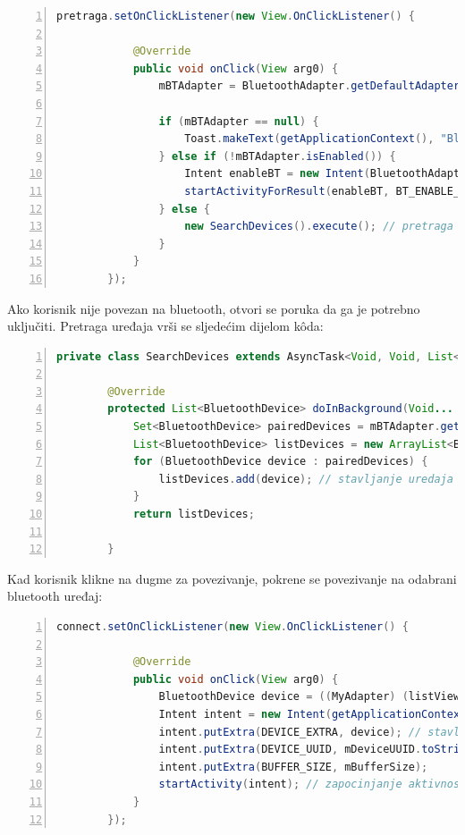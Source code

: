 \begin{lstlisting}[frame=single,language=Java,numbers=left, numberstyle=\tiny, xleftmargin=0.05\textwidth, xrightmargin=0.05\textwidth, basicstyle=\ttfamily\footnotesize]
pretraga.setOnClickListener(new View.OnClickListener() {

            @Override
            public void onClick(View arg0) {
                mBTAdapter = BluetoothAdapter.getDefaultAdapter(); // povezivanje na bluetooth adapter

                if (mBTAdapter == null) {
                    Toast.makeText(getApplicationContext(), "Bluetooth uredajii nisu pronadeni", Toast.LENGTH_SHORT).show(); // poruka ako nije pronaden ni jedan uredaj
                } else if (!mBTAdapter.isEnabled()) {
                    Intent enableBT = new Intent(BluetoothAdapter.ACTION_REQUEST_ENABLE);
                    startActivityForResult(enableBT, BT_ENABLE_REQUEST);
                } else {
                    new SearchDevices().execute(); // pretraga uredeja
                }
            }
        });
        \end{lstlisting}
 Ako korisnik nije povezan na bluetooth, otvori se poruka da ga je potrebno uključiti. Pretraga uređaja vrši se sljedećim dijelom kôda:
        \begin{lstlisting}[frame=single,language=Java,numbers=left, numberstyle=\tiny, xleftmargin=0.05\textwidth, xrightmargin=0.05\textwidth, basicstyle=\ttfamily\footnotesize]
   private class SearchDevices extends AsyncTask<Void, Void, List<BluetoothDevice>> {

        @Override
        protected List<BluetoothDevice> doInBackground(Void... params) {
            Set<BluetoothDevice> pairedDevices = mBTAdapter.getBondedDevices();
            List<BluetoothDevice> listDevices = new ArrayList<BluetoothDevice>(); // kreiranje liste
            for (BluetoothDevice device : pairedDevices) {
                listDevices.add(device); // stavljanje uredaja u listu
            }
            return listDevices;

        }
\end{lstlisting}

Kad korisnik klikne na dugme za povezivanje, pokrene se povezivanje na odabrani bluetooth uređaj:

\begin{lstlisting}[frame=single,language=Java,numbers=left, numberstyle=\tiny, xleftmargin=0.05\textwidth, xrightmargin=0.05\textwidth, basicstyle=\ttfamily\footnotesize]
connect.setOnClickListener(new View.OnClickListener() {

            @Override
            public void onClick(View arg0) {
                BluetoothDevice device = ((MyAdapter) (listView.getAdapter())).getSelectedItem();
                Intent intent = new Intent(getApplicationContext(), ControllingActivity.class); // novi intent 
                intent.putExtra(DEVICE_EXTRA, device); // stavljanje podataka o uredaju u intent
                intent.putExtra(DEVICE_UUID, mDeviceUUID.toString());
                intent.putExtra(BUFFER_SIZE, mBufferSize);
                startActivity(intent); // zapocinjanje aktivnosti
            }
        });
\end{lstlisting}


